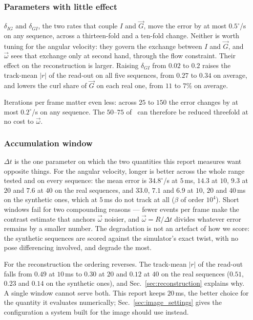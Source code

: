 \documentclass[journal]{IEEEtran}
\newcommand{\Imap}{I}
\newcommand{\Gmap}{\vec{G}}
\newcommand{\wvec}{\vec{\omega}}
\begin{document}
\subsubsection{Parameters with little effect}
\label{sec:other_deltas}
$\delta_{I\!G}$ and $\delta_{G\!I}$, the two rates that couple $\Imap$ and
$\Gmap$, move the error by at most $0.5^\circ$/s on any sequence, across a
thirteen-fold and a ten-fold change. Neither is worth tuning for the angular
velocity: they govern the exchange between $\Imap$ and $\Gmap$, and $\wvec$
sees that exchange only at second hand, through the flow constraint. Their
effect on the reconstruction is larger. Raising $\delta_{G\!I}$ from $0.02$ to
$0.2$ raises the track-mean $|r|$ of the read-out on all five sequences, from
$0.27$ to $0.34$ on average, and lowers the curl share of $\Gmap$ on each real
one, from $11$ to $7\%$ on average.

Iterations per frame matter even less: across $25$ to $150$ the error changes
by at most $0.2^\circ$/s on any sequence. The $50$--$75$
of~\cite{martel2019thesis} can therefore be reduced threefold at no cost to
$\wvec$.

\subsubsection{Accumulation window}
\label{sec:window_sweep}
$\Delta t$ is the one parameter on which the two quantities this report
measures want opposite things. For the angular velocity, longer is better
across the whole range tested and on every sequence: the mean error is
$34.8^\circ$/s at $5$\,ms, $14.3$ at $10$, $9.3$ at $20$ and $7.6$ at $40$ on
the real sequences, and $33.0$, $7.1$ and $6.9$ at $10$, $20$ and $40$\,ms on
the synthetic ones, which at $5$\,ms do not track at all ($\beta$ of order
$10^4$). Short windows fail for two compounding reasons --- fewer events per
frame make the contrast estimate that anchors $\wvec$ noisier, and
$\wvec = R/\Delta t$ divides whatever error remains by a smaller number. The
degradation is not an artefact of how we score: the synthetic sequences are
scored against the simulator's exact twist, with no pose differencing
involved, and degrade the most.

For the reconstruction the ordering reverses. The track-mean $|r|$ of the
read-out falls from $0.49$ at $10$\,ms to $0.30$ at $20$ and $0.12$ at $40$ on
the real sequences ($0.51$, $0.23$ and $0.14$ on the synthetic ones), and
Sec.~\ref{sec:reconstruction} explains why. A single window cannot serve both.
This report keeps $20$\,ms, the better choice for the quantity it evaluates
numerically; Sec.~\ref{sec:image_settings} gives the configuration a system
built for the image should use instead.
\end{document}
